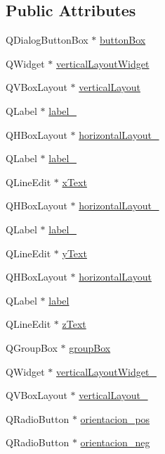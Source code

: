 \subsection*{Public Attributes}
\begin{DoxyCompactItemize}
\item 
Q\-Dialog\-Button\-Box $\ast$ \hyperlink{class_ui___translacional_dialog_a33199e9bf824102f6300a1ceb4354aca}{button\-Box}
\item 
Q\-Widget $\ast$ \hyperlink{class_ui___translacional_dialog_a74fb90caa54367a4c361e0d7fe7bc8ba}{vertical\-Layout\-Widget}
\item 
Q\-V\-Box\-Layout $\ast$ \hyperlink{class_ui___translacional_dialog_a24bdacaadef08fd1e3d0936400bced2e}{vertical\-Layout}
\item 
Q\-Label $\ast$ \hyperlink{class_ui___translacional_dialog_a6732967c8998f334885a1b8f23d054d1}{label\-\_}
\item 
Q\-H\-Box\-Layout $\ast$ \hyperlink{class_ui___translacional_dialog_a7e76649d47e077d7cb73056ee4765250}{horizontal\-Layout\-\_}
\item 
Q\-Label $\ast$ \hyperlink{class_ui___translacional_dialog_a346440ea60edd31d8da0fc279507d995}{label\-\_}
\item 
Q\-Line\-Edit $\ast$ \hyperlink{class_ui___translacional_dialog_a2e88b4a26642a0edb7cb033edf2c82bb}{x\-Text}
\item 
Q\-H\-Box\-Layout $\ast$ \hyperlink{class_ui___translacional_dialog_a66f99a13414c872e8980c067129b3c58}{horizontal\-Layout\-\_}
\item 
Q\-Label $\ast$ \hyperlink{class_ui___translacional_dialog_a2ecb0f99dfe0e0b3c9eec117fda5609a}{label\-\_}
\item 
Q\-Line\-Edit $\ast$ \hyperlink{class_ui___translacional_dialog_a5f48505552db27605a8d8da569752d25}{y\-Text}
\item 
Q\-H\-Box\-Layout $\ast$ \hyperlink{class_ui___translacional_dialog_a4a836c9f9e02a433288eff09f3138d3b}{horizontal\-Layout}
\item 
Q\-Label $\ast$ \hyperlink{class_ui___translacional_dialog_a0f1a9a25f53e660213d5edd8238a5afe}{label}
\item 
Q\-Line\-Edit $\ast$ \hyperlink{class_ui___translacional_dialog_a4c195ebd2f2d8aed1cb9060074e8996d}{z\-Text}
\item 
Q\-Group\-Box $\ast$ \hyperlink{class_ui___translacional_dialog_a2890847b40cd28ad2d27cd90ba2b3afd}{group\-Box}
\item 
Q\-Widget $\ast$ \hyperlink{class_ui___translacional_dialog_a8b2ecabdba120d862aa60a7918b76e36}{vertical\-Layout\-Widget\-\_}
\item 
Q\-V\-Box\-Layout $\ast$ \hyperlink{class_ui___translacional_dialog_aec3b3200d40f47fe79f30da6d5ae9a21}{vertical\-Layout\-\_}
\item 
Q\-Radio\-Button $\ast$ \hyperlink{class_ui___translacional_dialog_a5c72ba5f84d6d5b78f058bc6ed0cef34}{orientacion\-\_\-pos}
\item 
Q\-Radio\-Button $\ast$ \hyperlink{class_ui___translacional_dialog_ad398394cd6c79ae530eced9426652ce9}{orientacion\-\_\-neg}
\end{DoxyCompactItemize}



